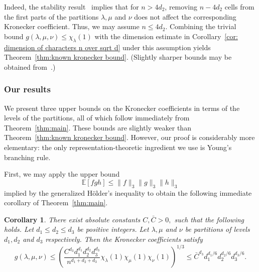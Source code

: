\documentclass[11pt, letterpaper]{amsart}
\newtheorem{cor}[thm]{Corollary}
\renewcommand\le{\leqslant}
\begin{document}

Indeed, the stability result~\cite[Theorem 1.2]{briand2011stability} implies that for $n>4d_2$, removing $n-4d_2$ cells from the first parts of the partitions $\lambda, \mu$ and $\nu$ does not affect the corresponding Kronecker coefficient. Thus, we may assume $n\le 4d_2$. Combining the trivial bound $g(\lambda, \mu, \nu) \le \chi_{\lambda}(1)$ with the dimension estimate in Corollary~\ref{cor: dimension of characters n over sqrt d} under this assumption yields Theorem~\ref{thm:known kronecker bound}. (Slightly sharper bounds may be obtained from~\cite{briand2011stability}.)

\subsubsection*{Our results}
We present three upper bounds on the Kronecker coefficients in terms of the levels of the partitions, all of which follow immediately from Theorem~\ref{thm:main}. These bounds are slightly weaker than Theorem~\ref{thm:known kronecker bound}. However, our proof is considerably more elementary: the only representation-theoretic ingredient we use is Young's branching rule.

First, we may apply the upper bound 
\[ \mathbb{E}[fgh]\le \|f\|_3\|g\|_3\|h\|_3\]
implied by the generalized H\"older's inequality to obtain the following immediate corollary of Theorem~\ref{thm:main}. 
 
\begin{cor}\label{cor: Kronecker coefficients}
There exist absolute constants $C,\bar{C}>0,$ such that the following holds. Let $d_1\le d_2\le d_3$ be positive integers. Let $\lambda, \mu$ and $\nu$ be partitions of levels $d_1,d_2$ and $d_3$ respectively.
Then the Kronecker coefficients satisfy
\[
g(\lambda, \mu, \nu) \le \left(\frac{C^{d_3}d_1^{d_1}d_2^{d_2}d_3^{d_3}}{n^{d_1+d_2+d_3}}\chi_{\lambda}(1)\chi_{\mu}(1)\chi_{\nu}(1)\right)^{1/3} \le \bar{C}^{d_{3}}d_{1}^{d_{1}/6}d_{2}^{d_{2}/6}d_{3}^{d_{3}/6}.
\]
\end{cor}
\end{document}
